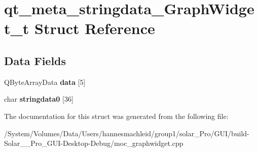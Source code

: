 \hypertarget{structqt__meta__stringdata___graph_widget__t}{}\section{qt\+\_\+meta\+\_\+stringdata\+\_\+\+Graph\+Widget\+\_\+t Struct Reference}
\label{structqt__meta__stringdata___graph_widget__t}
\subsection*{Data Fields}
\begin{DoxyCompactItemize}
\item 
\mbox{\label{structqt__meta__stringdata___graph_widget__t_ada9bebb76d0cb960b7a2033f4f228fe4}} 
Q\+Byte\+Array\+Data {\bfseries data} \mbox{[}5\mbox{]}
\item 
\mbox{\label{structqt__meta__stringdata___graph_widget__t_afaae3fd350b7d6b2084ff67e4c93b214}} 
char {\bfseries stringdata0} \mbox{[}36\mbox{]}
\end{DoxyCompactItemize}


The documentation for this struct was generated from the following file\+:\begin{DoxyCompactItemize}
\item 
/\+System/\+Volumes/\+Data/\+Users/hannesmachleid/group1/solar\+\_\+\+Pro/\+G\+U\+I/build-\/\+Solar\+\_\+\+\_\+\+Pro\+\_\+\+G\+U\+I-\/\+Desktop-\/\+Debug/moc\+\_\+graphwidget.\+cpp\end{DoxyCompactItemize}
